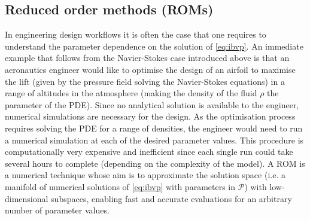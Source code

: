 \documentclass[../main.tex]{subfiles}
\begin{document}
\subsection{Reduced order methods (ROMs)}\label{subsec:roms}

In engineering design workflows it is often the case that one requires to understand the parameter dependence on the solution of \eqref{eq:ibvp}.
An immediate example that follows from the Navier-Stokes case introduced above is that an aeronautics engineer would like to optimise the design of an airfoil to maximise the lift (given by the pressure field solving the Navier-Stokes equations) in a range of altitudes in the atmosphere (making the density of the fluid $\rho$ the parameter of the PDE).
Since no analytical solution is available to the engineer, numerical simulations are necessary for the design.
As the optimisation process requires solving the PDE for a range of densities, the engineer would need to run a numerical simulation at each of the desired parameter values.
This procedure is computationally very expensive and inefficient since each single run could take several hours to complete (depending on the complexity of the model).
A ROM is a numerical technique whose aim is to approximate the solution space (i.e. a manifold of numerical solutions of \eqref{eq:ibvp} with parameters in $\mathcal{P}$) with low-dimensional subspaces, enabling fast and accurate evaluations for an arbitrary number of parameter values.


\end{document}
